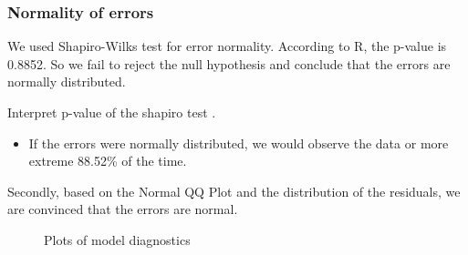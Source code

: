 \documentclass[a4paper,11pt,onecolumn,twoside]{article}
\begin{document}
\subsubsection{Normality of errors}
We used Shapiro-Wilks test for error normality. According to R, the p-value is 0.8852. So we fail to reject the null hypothesis and conclude that the errors are normally distributed.\par  
Interpret p-value of the shapiro test .
\begin{itemize}
	\item If the errors were normally distributed, we would observe the data or more extreme 88.52\% of the time.
\end{itemize}
\par
Secondly, based on the Normal QQ Plot and the distribution of the residuals, we are convinced that the errors are normal.
\begin{figure}[H]
	\centering
	\caption{Plots of model diagnostics}
\end{figure}
\end{document}
